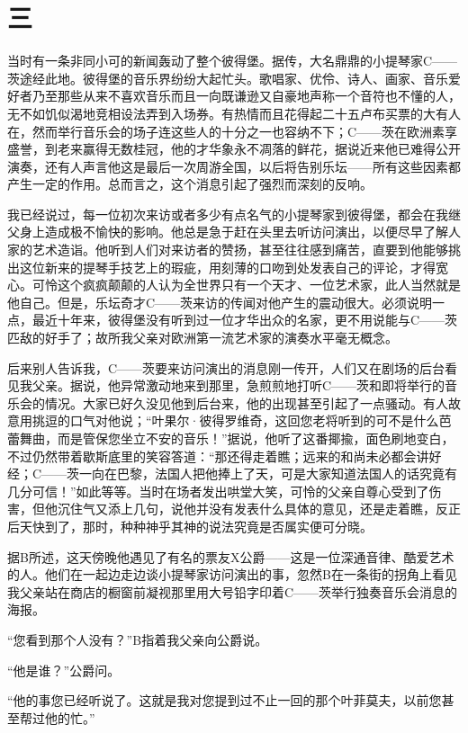 \documentclass[12pt, UTF8]{ctexbook}
\begin{document}
\section*{三}
\par 当时有一条非同小可的新闻轰动了整个彼得堡。据传，大名鼎鼎的小提琴家C——茨途经此地。彼得堡的音乐界纷纷大起忙头。歌唱家、优伶、诗人、画家、音乐爱好者乃至那些从来不喜欢音乐而且一向既谦逊又自豪地声称一个音符也不懂的人，无不如饥似渴地竞相设法弄到入场券。有热情而且花得起二十五卢布买票的大有人在，然而举行音乐会的场子连这些人的十分之一也容纳不下；C——茨在欧洲素享盛誉，到老来赢得无数桂冠，他的才华象永不凋落的鲜花，据说近来他已难得公开演奏，还有人声言他这是最后一次周游全国，以后将告别乐坛——所有这些因素都产生一定的作用。总而言之，这个消息引起了强烈而深刻的反响。
\par 我已经说过，每一位初次来访或者多少有点名气的小提琴家到彼得堡，都会在我继父身上造成极不愉快的影响。他总是急于赶在头里去听访问演出，以便尽早了解人家的艺术造诣。他听到人们对来访者的赞扬，甚至往往感到痛苦，直要到他能够挑出这位新来的提琴手技艺上的瑕疵，用刻薄的口吻到处发表自己的评论，才得宽心。可怜这个疯疯颠颠的人认为全世界只有一个天才、一位艺术家，此人当然就是他自己。但是，乐坛奇才C——茨来访的传闻对他产生的震动很大。必须说明一点，最近十年来，彼得堡没有听到过一位才华出众的名家，更不用说能与C——茨匹敌的好手了；故所我父亲对欧洲第一流艺术家的演奏水平毫无概念。
\par 后来别人告诉我，C——茨要来访问演出的消息刚一传开，人们又在剧场的后台看见我父亲。据说，他异常激动地来到那里，急煎煎地打听C——茨和即将举行的音乐会的情况。大家已好久没见他到后台来，他的出现甚至引起了一点骚动。有人故意用挑逗的口气对他说；“叶果尔·彼得罗维奇，这回您老将听到的可不是什么芭蕾舞曲，而是管保您坐立不安的音乐！”据说，他听了这番揶揄，面色刷地变白，不过仍然带着歇斯底里的笑容答道：“那还得走着瞧；远来的和尚未必都会讲好经；C——茨一向在巴黎，法国人把他捧上了天，可是大家知道法国人的话究竟有几分可信！”如此等等。当时在场者发出哄堂大笑，可怜的父亲自尊心受到了伤害，但他沉住气又添上几句，说他并没有发表什么具体的意见，还是走着瞧，反正后天快到了，那时，种种神乎其神的说法究竟是否属实便可分晓。
\par 据B所述，这天傍晚他遇见了有名的票友X公爵——这是一位深通音律、酷爱艺术的人。他们在一起边走边谈小提琴家访问演出的事，忽然B在一条街的拐角上看见我父亲站在商店的橱窗前凝视那里用大号铅字印着C——茨举行独奏音乐会消息的海报。
\par “您看到那个人没有？”B指着我父亲向公爵说。
\par “他是谁？”公爵问。
\par “他的事您已经听说了。这就是我对您提到过不止一回的那个叶菲莫夫，以前您甚至帮过他的忙。”
\end{document}
